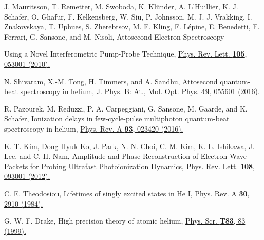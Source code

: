 \documentclass[7pt]{article}
\begin{document}
\begin{multicols}{2}
\begin{thebibliography}{30}
\bibitem{} J. Mauritsson, T. Remetter, M. Swoboda, K. Klünder, A.
L’Huillier, K. J. Schafer, O. Ghafur, F. Kelkensberg, W. Siu,
P. Johnsson, M. J. J. Vrakking, I. Znakovskaya, T. Uphues, S.
Zherebtsov, M. F. Kling, F. Lépine, E. Benedetti, F. Ferrari,
G. Sansone, and M. Nisoli, Attosecond Electron Spectroscopy
 



\newpage
\fancyhf{}
\fancyhead{}
\thispagestyle{UltimaPagina}


Using a Novel Interferometric Pump-Probe Technique, \href{https://journals.aps.org/prl/abstract/10.1103/PhysRevLett.105.053001}{Phys. Rev. Lett. \textbf{105}, 053001 (2010).}
\vspace{-1.5mm}

\bibitem{} N. Shivaram, X.-M. Tong, H. Timmers, and A. Sandhu,
Attosecond quantum-beat spectroscopy in helium, \href{https://iopscience.iop.org/article/10.1088/0953-4075/49/5/055601}{J. Phys. B:
At., Mol. Opt. Phys. \textbf{49}, 055601 (2016).}
\vspace{-1.5mm}

\bibitem{} R. Pazourek, M. Reduzzi, P. A. Carpeggiani, G. Sansone, M.
Gaarde, and K. Schafer, Ionization delays in few-cycle-pulse
multiphoton quantum-beat spectroscopy in helium, \href{https://journals.aps.org/pra/abstract/10.1103/PhysRevA.93.023420}{Phys. Rev.
A \textbf{93}, 023420 (2016).}
\vspace{-1.5mm}

\bibitem{} K. T. Kim, Dong Hyuk Ko, J. Park, N. N. Choi, C. M. Kim,
K. L. Ishikawa, J. Lee, and C. H. Nam, Amplitude and Phase
Reconstruction of Electron Wave Packets for Probing Ultrafast Photoionization Dynamics, \href{https://journals.aps.org/prl/abstract/10.1103/PhysRevLett.108.093001}{Phys. Rev. Lett. \textbf{108}, 093001
(2012).}
\vspace{-1.5mm}

\bibitem{} C. E. Theodosiou, Lifetimes of singly excited states in He I,
\href{https://journals.aps.org/pra/abstract/10.1103/PhysRevA.30.2910}{Phys. Rev. A \textbf{30}, 2910 (1984).}
\vspace{-1.5mm}

\bibitem{} G. W. F. Drake, High precision theory of atomic helium, \href{https://iopscience.iop.org/article/10.1238/Physica.Topical.083a00083}{Phys.
Scr. \textbf{T83}, 83 (1999).}
\vspace{-1.5mm}


\end{thebibliography}
\end{multicols}
\end{document}
